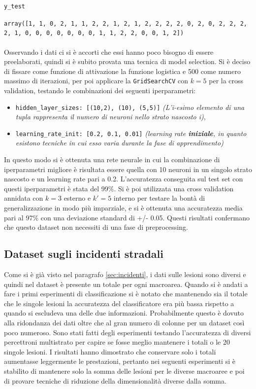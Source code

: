 \documentclass[12pt, twoside, letterpaper]{report}
\begin{document}
			\begin{lstlisting}[language=Python, gobble=8]
				y_test
			\end{lstlisting}
			\texttt{array([1, 1, 0, 2, 1, 1, 2, 2, 1, 2, 1, 2, 2, 2, 2, 0, 2, 0, 2, 2, 2, 2, 1, 0, 0, 0, 0, 0, 0, 0, 1, 1, 2, 2, 0, 0, 1, 2])}\\\\
			Osservando i dati ci si è accorti che essi hanno poco bisogno di essere preelaborati, quindi si è subito provata una tecnica di model selection. Si è deciso di fissare come funzione di attivazione la funzione logistica e 500 come numero massimo di iterazioni, per poi applicare la \texttt{GridSearchCV} con $k=5$ per la cross validation, testando le combinazioni dei seguenti iperparametri:
			\begin{itemize}
				\item \texttt{hidden\_layer\_sizes: [(10,2), (10), (5,5)]} \textit{(L'i-esimo elemento di una tupla rappresenta il numero di neuroni nello strato nascosto i)},
	    		\item \texttt{learning\_rate\_init: [0.2, 0.1, 0.01]} \textit{(learning rate \textbf{iniziale}, in quanto esistono tecniche in cui esso varia durante la fase di apprendimento)}
			\end{itemize}
			In questo modo si è ottenuta una rete neurale in cui la combinazione di iperparametri migliore è risultata essere quella con 10 neuroni in un singolo strato nascosto e un learning rate pari a 0.2. L'accuratezza conseguita sul test set con questi iperparametri è  stata del 99\%. Si è poi utilizzata una cross validation annidata con $k = 3$ esterno e $k' = 5$  interno per testare la bontà di generalizzazione in modo più imparziale, e si è ottenuta una accuratezza media pari al 97\% con una deviazione standard di +/- 0.05. Questi risultati confermano che questo	dataset non necessiti di una fase di preprocessing.
		
		\subsection{Dataset sugli incidenti stradali}
			Come si è già visto nel paragrafo \ref{sec:incidenti}, i dati sulle lesioni sono diversi e quindi nel dataset è presente un totale per ogni macroarea. Quando si è andati a fare i primi esperimenti di classificazione si è notato che mantenendo sia il totale che le singole lesioni la accuratezza del classificatore era più bassa rispetto a quando si escludeva una delle due informazioni. Probabilmente questo è dovuto alla ridondanza dei dati oltre che al gran numero di colonne per un dataset così poco numeroso. Sono stati fatti degli esperimenti testando l'accuratezza di diversi percettroni multistrato per capire se fosse meglio mantenere i totali o le 20 singole lesioni. I risultati hanno dimostrato che conservare solo i totali aumentasse leggermente le prestazioni, pertanto nei seguenti esperimenti si è stabilito di mantenere solo la somma delle lesioni per le diverse macroaree e poi di provare tecniche di riduzione della dimensionalità diverse dalla somma.
			
\end{document}
